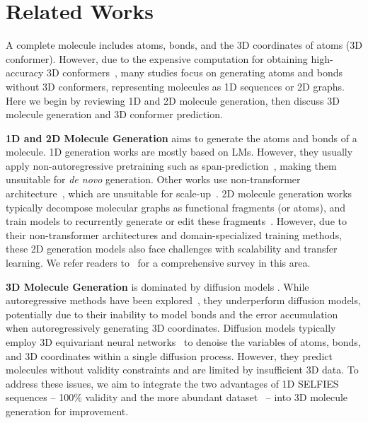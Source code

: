 \vspace{-2mm}
\section{Related Works}
\vspace{-2mm}
A complete molecule includes atoms, bonds, and the 3D coordinates of atoms (\ie 3D conformer). However, due to the expensive computation for obtaining high-accuracy 3D conformers~\citep{GEOM}, many studies focus on generating atoms and bonds without 3D conformers, representing molecules as 1D sequences or 2D graphs. Here we begin by reviewing 1D and 2D molecule generation, then discuss 3D molecule generation and 3D conformer prediction.


\textbf{1D and 2D Molecule Generation} aims to generate the atoms and bonds of a molecule. 1D generation works are mostly based on LMs. However, they usually apply non-autoregressive pretraining such as span-prediction~\citep{Chemformer,MolGen,RegressionTransformer}, making them unsuitable for \textit{de novo} generation. Other works use non-transformer architecture~\citep{RandomSmiles,moses,flam2022language,gomez2018automatic,LIMO,popova2018deep}, which are unsuitable for scale-up~\citep{Transformer}. 2D molecule generation works typically decompose molecular graphs as functional fragments (or atoms), and train models to recurrently generate or edit these fragments~\citep{JT-VAE,MARS,GraphDF,GraphAF,MolSearch,CGVAE,you2018graph,popova2019molecularrnn,VJTNN}. However, due to their non-transformer architectures and domain-specialized training methods, these 2D generation models also face challenges with scalability and transfer learning. We refer readers to~\citep{du2022molgensurvey} for a comprehensive survey in this area.

\textbf{3D Molecule Generation} is dominated by diffusion models \citep{EDM,EEGSDE,CDGS,JODO,MDM,MiDi,MUDiff}. While autoregressive methods have been explored~\citep{GSchNet,cGSchNet,GSphereNet,MolGym}, they underperform diffusion models, potentially due to their inability to model bonds and the error accumulation when autoregressively generating 3D coordinates.
Diffusion models typically employ 3D equivariant neural networks~\citep{EGNN} to denoise the variables of atoms, bonds, and 3D coordinates within a single diffusion process. However, they predict molecules without validity constraints and are limited by insufficient 3D data. To address these issues, we aim to integrate the two advantages of 1D SELFIES sequences -- 100\% validity and the more abundant dataset~\citep{ZINC15,ZINC22} -- into 3D molecule generation for improvement.

